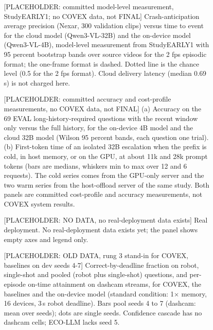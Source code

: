 \documentclass[sigconf]{acmart}
\begin{document}
\clearpage
\begin{figure}[t]
\centering
{\selectfont
}
\caption{[PLACEHOLDER: committed model-level measurement, StudyEARLY1; no COVEX data, not FINAL] Crash-anticipation average precision (Nexar, 300 validation clips) versus time to event for the cloud model (Qwen3-VL-32B) and the on-device model (Qwen3-VL-4B), model-level measurement from StudyEARLY1 with 95 percent bootstrap bands over source videos for the 2 fps episodic format; the one-frame format is dashed. Dotted line is the chance level (0.5 for the 2 fps format). Cloud delivery latency (median 0.69 s) is not charged here.}
\label{fig:F15_ap_vs_time_to_event}
\end{figure}
\clearpage
\begin{figure}[t]
\centering
{\selectfont
}
\caption{[PLACEHOLDER: committed accuracy and cost-profile measurements, no COVEX data, not FINAL] (a) Accuracy on the 69 EVAL long-history-required questions with the recent window only versus the full history, for the on-device 4B model and the cloud 32B model (Wilson 95 percent bands, each question one trial). (b) First-token time of an isolated 32B escalation when the prefix is cold, in host memory, or on the GPU, at about 11k and 28k prompt tokens (bars are medians, whiskers min to max over 12 and 6 requests). The cold series comes from the GPU-only server and the two warm series from the host-offload server of the same study. Both panels are committed cost-profile and accuracy measurements, not COVEX system results.}
\label{fig:F16_history_and_warm}
\end{figure}
\clearpage
\begin{figure}[t]
\centering
{\selectfont
}
\caption{[PLACEHOLDER: NO DATA, no real-deployment data exists] Real deployment. No real-deployment data exists yet; the panel shows empty axes and legend only.}
\label{fig:F17_real_deployment}
\end{figure}
\clearpage
\begin{figure}[t]
\centering
{\selectfont
}
\caption{[PLACEHOLDER: OLD DATA, rung 3 stand-in for COVEX, baselines on dev seeds 4-7] Correct-by-deadline fraction on robot, single-shot and pooled (robot plus single-shot) questions, and per-episode on-time attainment on dashcam streams, for COVEX, the baselines and the on-device model (standard condition: 1$\times$ memory, 16 devices, 3\,s robot deadline). Bars pool seeds 4 to 7 (dashcam: mean over seeds); dots are single seeds. Confidence cascade has no dashcam cells; ECO-LLM lacks seed 5.}
\label{fig:F1_headline}
\end{figure}
\end{document}
